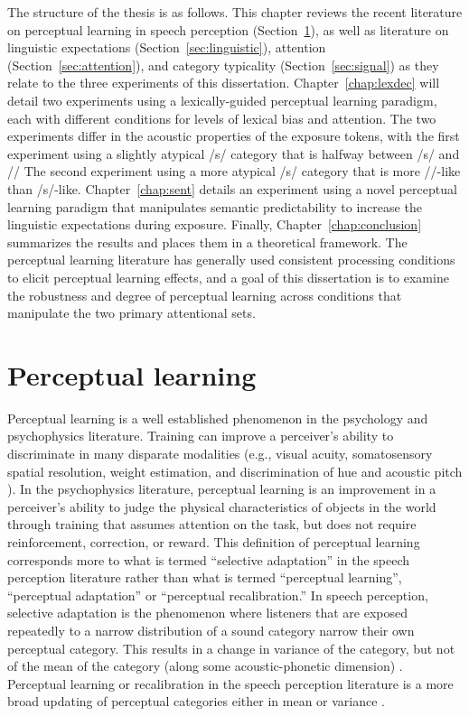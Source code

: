 The structure of the thesis is as follows.
This chapter reviews the recent literature on perceptual learning in speech perception (Section~\ref{sec:perceptuallearning}), as well as literature on linguistic expectations (Section~\ref{sec:linguistic}), attention (Section~\ref{sec:attention}), and category typicality (Section~\ref{sec:signal}) as they relate to the three experiments of this dissertation.
Chapter~\ref{chap:lexdec} will detail two experiments using a lexically-guided perceptual learning paradigm, each with different conditions for levels of lexical bias and attention.  
The two experiments differ in the acoustic properties of the exposure tokens, with the first experiment using a slightly atypical /s/ category that is halfway between /s/ and /\textesh/
The second experiment using a more atypical /s/ category that is more /\textesh/-like than /s/-like.  
Chapter~\ref{chap:sent} details an experiment using a novel perceptual learning paradigm that manipulates semantic predictability to increase the linguistic expectations during exposure.
Finally, Chapter~\ref{chap:conclusion} summarizes the results and places them in a theoretical framework.
The perceptual learning literature has generally used consistent processing conditions to elicit perceptual learning effects, and a goal of this dissertation is to examine the robustness and degree of perceptual learning across conditions that manipulate the two primary attentional sets.

\section{Perceptual learning}
\label{sec:perceptuallearning}

Perceptual learning is a well established phenomenon in the psychology and psychophysics literature. 
Training can improve a perceiver's ability to discriminate in many disparate modalities (e.g., visual acuity, somatosensory spatial resolution, weight estimation, and discrimination of hue and acoustic pitch \citep[for review]{Gibson1953}). 
In the psychophysics literature, perceptual learning is an improvement in a perceiver's ability to judge the physical characteristics of objects in the world through training that assumes attention on the task, but does not require reinforcement, correction, or reward.
This definition of perceptual learning corresponds more to what is termed ``selective adaptation'' in the speech perception literature rather than what is termed ``perceptual learning'', ``perceptual adaptation'' or ``perceptual recalibration.''  
In speech perception, selective adaptation is the phenomenon where listeners that are exposed repeatedly to a narrow distribution of a sound category narrow their own perceptual category.
This results in a change in variance of the category, but not of the mean of the category (along some acoustic-phonetic dimension) \citep{Eimas1973,Samuel1986,Vroomen2007}.
Perceptual learning or recalibration in the speech perception literature is a more broad updating of perceptual categories either in mean or variance \citep{Norris2003, Vroomen2007}.

